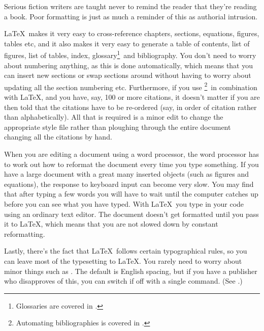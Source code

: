 Serious fiction writers are taught never to remind the reader that
they're reading a book. Poor formatting is just as much a reminder
of this as authorial intrusion.

\LaTeX\ makes it very easy to cross-reference chapters, sections,
equations, figures, tables etc, and it also makes it very easy to
generate a table of contents, list of figures, list of tables,
index, glossary\footnote{Glossaries are covered in \latexthesis.}\ and 
bibliography. You don't need to worry about numbering anything,
as this is done automatically, which means that you can insert new
sections or swap sections around without having to worry about
updating all the section numbering etc. Furthermore, if you use
\BiBTeX\footnote{Automating bibliographies is covered in
\latexthesis.}\ in combination with \LaTeX, and you have, say, 100
or more citations, it doesn't matter if you are then told that the
citations have to be re-ordered (say, in order of citation rather
than alphabetically). All that is required is a minor edit to change
the appropriate style file rather than ploughing through the entire
document changing all the citations by hand.

When you are editing a document using a word processor, the
word processor has to work out how to reformat the document every time
you type something.  If you have a large document with a great many
inserted objects (such as figures and equations), the response to
keyboard input can become very slow.  You may find that after typing
a few words you will have to wait until the computer catches up
before you can see what you have typed.  With \LaTeX\ you type in your
code using an ordinary text editor.  The document 
doesn't get formatted until you pass it to \LaTeX, which means that 
you are not slowed down by constant reformatting.

Lastly, there's the fact that \LaTeX\ follows certain typographical
rules, so you can leave most of the typesetting to \LaTeX. You
rarely need to worry about minor things such as
. The default is English spacing, but
if you have a publisher who disapproves of this, you can switch if
off with a single command. (See .)

